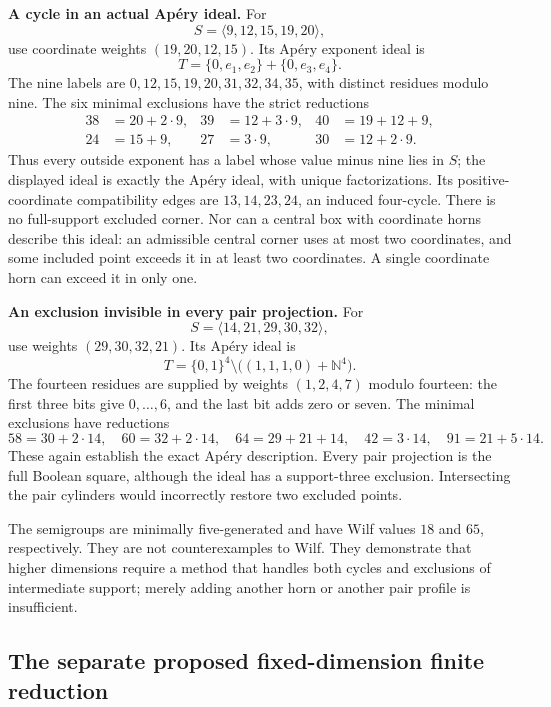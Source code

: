 \documentclass[
  11pt,
  a4paper,
]{article}
\begin{document}
\textbf{A cycle in an actual Apéry ideal.} For \[
S=\langle9,12,15,19,20\rangle,
\] use coordinate weights \((19,20,12,15)\). Its Apéry exponent ideal is
\[
T=\{0,e_1,e_2\}+\{0,e_3,e_4\}.
\] The nine labels are \(0,12,15,19,20,31,32,34,35\), with distinct
residues modulo nine. The six minimal exclusions have the strict
reductions \[
\begin{aligned}
38&=20+2\cdot9,&39&=12+3\cdot9,&40&=19+12+9,\\
24&=15+9,&27&=3\cdot9,&30&=12+2\cdot9.
\end{aligned}
\] Thus every outside exponent has a label whose value minus nine lies
in \(S\); the displayed ideal is exactly the Apéry ideal, with unique
factorizations. Its positive-coordinate compatibility edges are
\(13,14,23,24\), an induced four-cycle. There is no full-support
excluded corner. Nor can a central box with coordinate horns describe
this ideal: an admissible central corner uses at most two coordinates,
and some included point exceeds it in at least two coordinates. A single
coordinate horn can exceed it in only one.

\textbf{An exclusion invisible in every pair projection.} For \[
S=\langle14,21,29,30,32\rangle,
\] use weights \((29,30,32,21)\). Its Apéry ideal is \[
T=\{0,1\}^4\setminus\bigl((1,1,1,0)+\mathbb N^4\bigr).
\] The fourteen residues are supplied by weights \((1,2,4,7)\) modulo
fourteen: the first three bits give \(0,\ldots,6\), and the last bit
adds zero or seven. The minimal exclusions have reductions \[
58=30+2\cdot14,\quad60=32+2\cdot14,\quad
64=29+21+14,\quad42=3\cdot14,\quad91=21+5\cdot14.
\] These again establish the exact Apéry description. Every pair
projection is the full Boolean square, although the ideal has a
support-three exclusion. Intersecting the pair cylinders would
incorrectly restore two excluded points.

The semigroups are minimally five-generated and have Wilf values \(18\)
and \(65\), respectively. They are not counterexamples to Wilf. They
demonstrate that higher dimensions require a method that handles both
cycles and exclusions of intermediate support; merely adding another
horn or another pair profile is insufficient.

\hypertarget{the-separate-proposed-fixed-dimension-finite-reduction}{%
\subsection{The separate proposed fixed-dimension finite
reduction}\label{the-separate-proposed-fixed-dimension-finite-reduction}}
\end{document}
